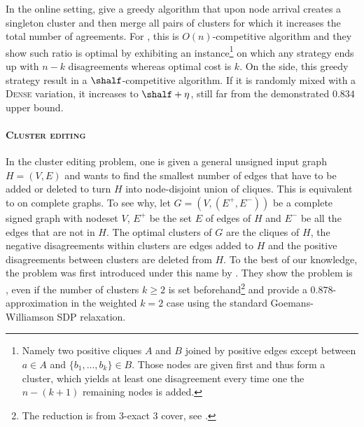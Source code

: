 In the online setting, \textcite{greedyOnline10} give a greedy algorithm that upon node arrival creates a
singleton cluster and then merge all pairs of clusters for which it increases the total number of
agreements. For \mind{}, this is $O(n)$-competitive algorithm and they show such ratio is optimal by
exhibiting an instance\footnote{Namely two positive cliques $A$ and $B$ joined by positive edges except
between $a\in A$ and $\{b_1,\ldots, b_k\}\in B$. Those nodes are given first and thus form a cluster,
which yields at least one disagreement every time one the $n-(k+1)$ remaining nodes is added.} on
which any strategy ends up with $n - k$ disagreements whereas optimal cost is $k$. On the \maxa{}
side, this greedy strategy result in a $\shalf$-competitive algorithm. If it is randomly mixed with a
\textsc{Dense} variation, it increases to $\shalf+\eta$, still far from the demonstrated $0.834$ upper
bound.

\paragraph{\textsc{Cluster editing}}
\label{par:cc_editing}


In the cluster editing problem, one is given a general unsigned input graph $H=(V,E)$ and wants to
find the smallest number of edges that have to be added or deleted to turn $H$ into node-disjoint
union of cliques. This is equivalent to \pcc{} on complete graphs. To see why, let $G=(V,(E^+,E^-))$
be a complete signed graph with nodeset $V$, $E^+$ be the set $E$ of edges of $H$ and $E^-$ be all
the edges that are not in $H$. The optimal clusters of $G$ are the cliques of $H$, the negative
disagreements within clusters are edges added to $H$ and the positive disagreements between clusters
are deleted from $H$.  To the best of our knowledge, the problem was first introduced under this
name by \textcite{Shamir02}. They show the problem is
\NPc{}, even if the number of clusters $k\geq2$ is set beforehand\footnote{The reduction is from
3-exact 3 cover, see \autocite[Theorems 1, 2 and Corollary 1]{Shamir02}.} and provide a
$0.878$-approximation in the weighted $k=2$ case using the standard Goemans-Williamson SDP
relaxation. 

